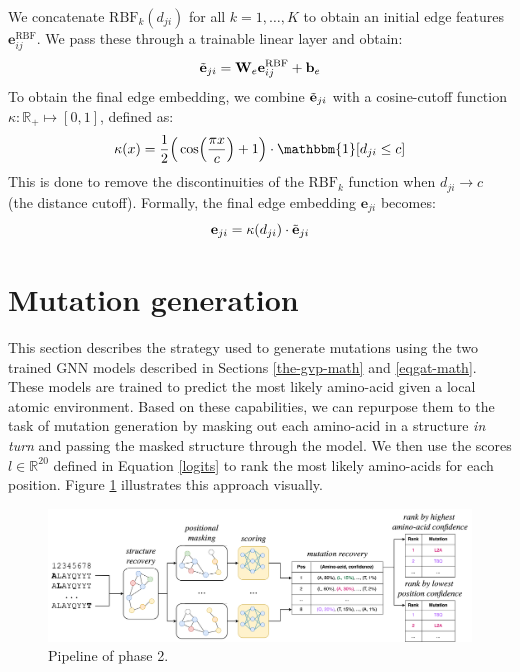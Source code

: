 We concatenate $\text{RBF}_k(d_{ji})$ for all $k = 1,\dots,K$ to obtain an initial edge features $\mathbf{e}^{\text{RBF}}_{ij}$. We pass these through a trainable linear layer and obtain:
\begin{equation}
    \Tilde{\mathbf{e}}_{ji} = \mathbf{W}_e\mathbf{e}^{\text{RBF}}_{ij} + \mathbf{b}_e
\end{equation}
To obtain the final edge embedding, we combine $\Tilde{\mathbf{e}}_{ji}$ with a cosine-cutoff function $\kappa:\mathbb{R}_{+}\mapsto [0,1]$, defined as:
\begin{equation}
    \kappa(x) = \frac{1}{2}\Big(\cos (\frac{\pi x}{c}) + 1\Big)\cdot \mathbbm{1}[d_{ji}\leq c]
\end{equation}
This is done to remove the discontinuities of the $\text{RBF}_k$ function when $d_{ji}\rightarrow c$ (the distance cutoff). Formally, the final edge embedding $\mathbf{e}_{ji}$ becomes:
\begin{equation}
    \mathbf{e}_{ji} = \kappa(d_{ji})\cdot \Tilde{\mathbf{e}}_{ji}
\end{equation}

\section{Mutation generation}
\label{sec:mutation-generation}
This section describes the strategy used to generate mutations using the two trained GNN models described in Sections \ref{the-gvp-math} and \ref{eqgat-math}. These models are trained to predict the most likely amino-acid given a local atomic environment. Based on these capabilities, we can repurpose them to the task of mutation generation by masking out each amino-acid in a structure \textit{in turn} and passing the masked structure through the model. We then use the scores $l \in \mathbb{R}^{20}$ defined in Equation \ref{logits} to rank the most likely amino-acids for each position. Figure \ref{mutation-generation} illustrates this approach visually. 

\begin{figure}
    \centering
    \includegraphics[width=\textwidth]{masters-report/figures/mutation_generation_final.png}
    \caption{Pipeline of phase 2.}
    \label{mutation-generation}
\end{figure}


